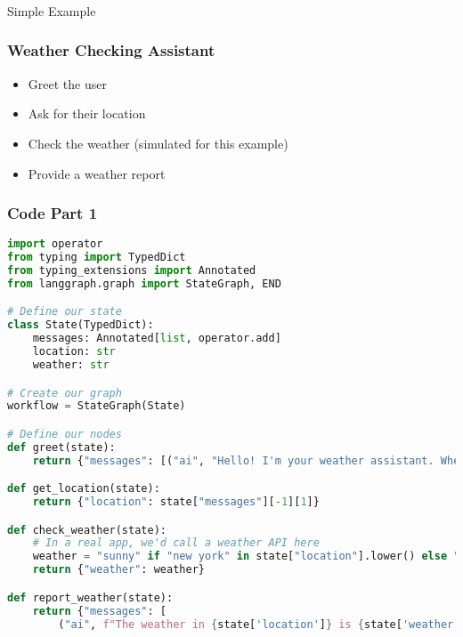\begin{frame}[fragile]\frametitle{}
\begin{center}
{\Large Simple Example}
\end{center}
\end{frame}

\begin{frame}[fragile]\frametitle{Weather Checking Assistant}
      \begin{itemize}
        \item Greet the user
        \item Ask for their location
        \item Check the weather (simulated for this example)
        \item Provide a weather report
      \end{itemize}
\end{frame}

\begin{frame}[fragile]\frametitle{Code Part 1}
      \begin{lstlisting}[language=Python, basicstyle=\tiny]
import operator
from typing import TypedDict
from typing_extensions import Annotated
from langgraph.graph import StateGraph, END

# Define our state
class State(TypedDict):
    messages: Annotated[list, operator.add]
    location: str
    weather: str

# Create our graph
workflow = StateGraph(State)

# Define our nodes
def greet(state):
    return {"messages": [("ai", "Hello! I'm your weather assistant. Where are you located?")]}

def get_location(state):
    return {"location": state["messages"][-1][1]}

def check_weather(state):
    # In a real app, we'd call a weather API here
    weather = "sunny" if "new york" in state["location"].lower() else "rainy"
    return {"weather": weather}

def report_weather(state):
    return {"messages": [
        ("ai", f"The weather in {state['location']} is {state['weather']}. Can I help you with anything else?")]}
      \end{lstlisting}
\end{frame}



